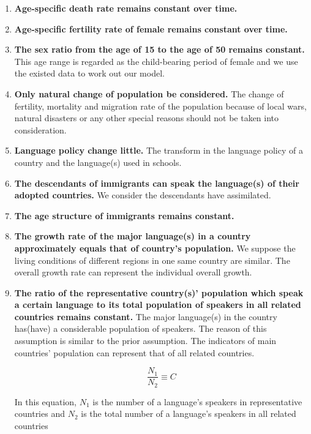 \documentclass{mcmthesis}
\begin{document}
\begin{enumerate}
  \item \textbf{Age-specific death rate remains constant over time.}
  \item \textbf{Age-specific fertility rate of female remains constant over time.}
  \item \textbf{The sex ratio from the age of 15 to the age of 50 remains constant.}  This age range is regarded as the child-bearing period of female and we use the existed data to work out our model.
  \item \textbf{Only natural change of population be considered.}  The change of fertility, mortality and migration rate of the population because of local wars, natural disasters or any other special reasons should not be taken into consideration.
  \item \textbf{Language policy change little.}  The transform in the language policy of a country and the language(s) used in schools.
  \item \textbf{The descendants of immigrants can speak the language(s) of their adopted countries.} We consider the descendants have assimilated.
  \item \textbf{The age structure of immigrants remains constant.}
  \item \textbf{The growth rate of the major language(s) in a country approximately equals that of country's population.}  We suppose the living conditions of different regions in one same country are similar. The overall growth rate can represent the individual overall growth.
  \item \textbf{The ratio of the representative country(s)' population which speak a certain language to its total population of speakers in all related countries remains constant.}  The major language(s) in the country has(have) a considerable population of speakers. The reason of this assumption is similar to the prior assumption. The indicators of main countries' population can represent that of all related countries.

      \begin{equation}\label{the first equation}
        \frac{N_1}{N_2}   \equiv C
      \end{equation}

      In this equation, $N_1$ is the number of a language's speakers in representative countries and $N_2$ is the total number of a language's speakers in all related countries

\end{enumerate}
\end{document}
